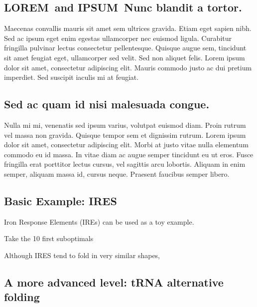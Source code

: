 \documentclass[10pt,letterpaper]{article}
\newcommand{\lorem}{{\bf LOREM}}
\newcommand{\ipsum}{{\bf IPSUM}}
\begin{document}
\subsection*{\lorem\ and \ipsum\ Nunc blandit a tortor.}

Maecenas convallis mauris sit amet sem ultrices gravida. Etiam eget sapien nibh. Sed ac ipsum eget enim egestas ullamcorper nec euismod ligula. Curabitur fringilla pulvinar lectus consectetur pellentesque. Quisque augue sem, tincidunt sit amet feugiat eget, ullamcorper sed velit. Sed non aliquet felis. Lorem ipsum dolor sit amet, consectetur adipiscing elit. Mauris commodo justo ac dui pretium imperdiet. Sed suscipit iaculis mi at feugiat. 

\subsection*{Sed ac quam id nisi malesuada congue.}

Nulla mi mi, venenatis sed ipsum varius, volutpat euismod diam. Proin rutrum vel massa non gravida. Quisque tempor sem et dignissim rutrum. Lorem ipsum dolor sit amet, consectetur adipiscing elit. Morbi at justo vitae nulla elementum commodo eu id massa. In vitae diam ac augue semper tincidunt eu ut eros. Fusce fringilla erat porttitor lectus cursus, vel sagittis arcu lobortis. Aliquam in enim semper, aliquam massa id, cursus neque. Praesent faucibus semper libero.

\subsection*{Basic Example: IRES}

Iron Response Elements (IREs) can be used as a toy example.

Take the 10 first suboptimals

 
Although IRES tend to fold in very similar shapes, 

\subsection*{A more advanced level: tRNA alternative folding}
\end{document}

